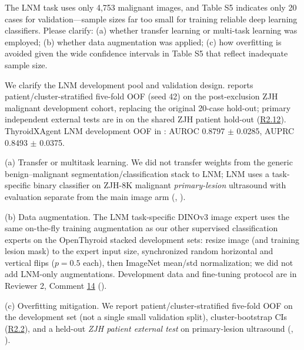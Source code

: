 \label{rev:R2.11}
\begin{reviewercomment}
The LNM task uses only 4,753 malignant images, and Table S5 indicates only 20 cases for validation---sample sizes far too small for training reliable deep learning classifiers. Please clarify: (a) whether transfer learning or multi-task learning was employed; (b) whether data augmentation was applied; (c) how overfitting is avoided given the wide confidence intervals in Table S5 that reflect inadequate sample size.
\end{reviewercomment}
\begin{authorresponse}
We clarify the LNM development pool and validation design.  reports patient/cluster-stratified five-fold OOF (seed 42) on the post-exclusion ZJH malignant development cohort, replacing the original 20-case hold-out; primary independent external tests are in  on the shared ZJH patient hold-out (\hyperref[rev:R2.12]{R2.12}). ThyroidXAgent LNM development OOF in : AUROC 0.8797 $\pm$ 0.0285, AUPRC 0.8493 $\pm$ 0.0375.\par
(a) Transfer or multitask learning. We did not transfer weights from the generic benign--malignant segmentation/classification stack to LNM; LNM uses a task-specific binary classifier on ZJH-8K malignant \emph{primary-lesion} ultrasound with evaluation separate from the main image arm (, ).\par
(b) Data augmentation. The LNM task-specific DINOv3 image expert uses the same on-the-fly training augmentation as our other supervised classification experts on the OpenThyroid stacked development sets: resize image (and training lesion mask) to the expert input size, synchronized random horizontal and vertical flips ($p{=}0.5$ each), then ImageNet mean/std normalization; we did not add LNM-only augmentations. Development data and fine-tuning protocol are in Reviewer 2, Comment \hyperref[rev:R2.14]{14} ().\par
(c) Overfitting mitigation. We report patient/cluster-stratified five-fold OOF on the development set (not a single small validation split), cluster-bootstrap CIs (\hyperref[rev:R2.2]{R2.2}), and a held-out \emph{ZJH patient external test} on primary-lesion ultrasound (, ).\par
\par
\end{authorresponse}

